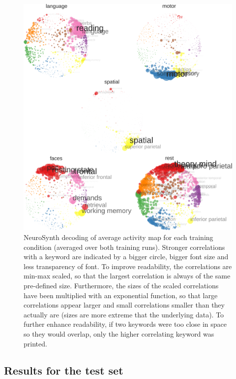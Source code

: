 \documentclass[fleqn,10pt]{SelfArx} %
\begin{document}
\begin{figure}[htbp]
	\begin{minipage}{\textwidth}
		\renewcommand{\familydefault}{\sfdefault}\normalfont
		\centering
		\includegraphics[width=\columnwidth]{./figs/fig5_nsSpacesTrain.png}
				\vspace*{-3mm}
		\caption{NeuroSynth decoding of average activity map for each training condition (averaged over both training runs). Stronger correlations with a keyword are indicated by a bigger circle, bigger font size and less transparency of font. To improve readability, the correlations are min-max scaled, so that the largest correlation is always of the same pre-defined size. Furthermore, the sizes of the scaled correlations have been multiplied with an exponential function, so that large correlations appear larger and small correlations smaller than they actually are (sizes are more extreme that the underlying data). To further enhance readability, if two keywords were too close in space so they would overlap, only the higher correlating keyword was printed.}%
		\label{fig:trainNs}
	\end{minipage}
\end{figure}


\subsection{Results for the test set}
\end{document}
